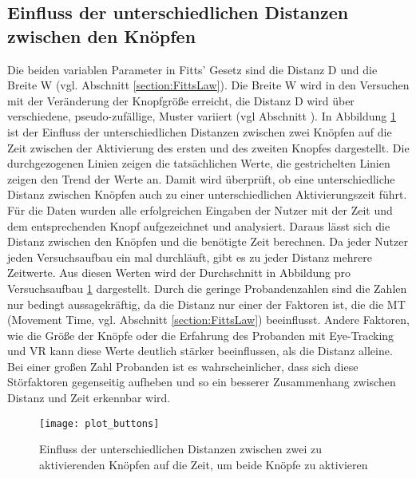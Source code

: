 \subsection{Einfluss der unterschiedlichen Distanzen zwischen den Knöpfen}
Die beiden variablen Parameter  in Fitts' Gesetz sind die Distanz D und die Breite W (vgl. Abschnitt \ref{section:FittsLaw}). Die Breite W wird in den Versuchen mit der Veränderung der Knopfgröße erreicht, die Distanz D wird über verschiedene, pseudo-zufällige, Muster variiert (vgl Abschnitt ). In Abbildung \ref{fig:plotbuttons} ist der Einfluss der unterschiedlichen Distanzen zwischen zwei Knöpfen auf die Zeit zwischen der Aktivierung des ersten und des zweiten Knopfes dargestellt. Die durchgezogenen Linien zeigen die tatsächlichen Werte, die gestrichelten Linien zeigen den Trend der Werte an. Damit wird überprüft, ob eine unterschiedliche Distanz zwischen Knöpfen auch zu einer unterschiedlichen Aktivierungszeit führt. Für die Daten wurden alle erfolgreichen Eingaben der Nutzer mit der Zeit und dem entsprechenden Knopf aufgezeichnet und analysiert. Daraus lässt sich die Distanz zwischen den Knöpfen und die benötigte Zeit berechnen. Da jeder Nutzer jeden Versuchsaufbau ein mal durchläuft, gibt es zu jeder Distanz mehrere Zeitwerte. Aus diesen Werten wird der Durchschnitt in Abbildung pro Versuchsaufbau \ref{fig:plotbuttons} dargestellt. Durch die geringe Probandenzahlen sind die Zahlen nur bedingt aussagekräftig, da die Distanz nur einer der Faktoren ist, die die MT (Movement Time, vgl. Abschnitt \ref{section:FittsLaw}) beeinflusst. Andere Faktoren, wie die Größe der Knöpfe oder die Erfahrung des Probanden mit Eye-Tracking und VR kann diese Werte deutlich stärker beeinflussen, als die Distanz alleine. Bei einer großen Zahl Probanden ist es wahrscheinlicher, dass sich diese Störfaktoren gegenseitig aufheben und so ein besserer Zusammenhang zwischen Distanz und Zeit erkennbar wird.
\begin{figure}[!htbp]
	\centering
	\texttt{[image: plot\_buttons]}
	\caption[Einfluss der unterschiedlichen Distanzen zwischen zwei zu aktivierenden Knöpfen auf die Zeit, um beide Knöpfe zu aktivieren]{Einfluss der unterschiedlichen Distanzen zwischen zwei zu aktivierenden Knöpfen auf die Zeit, um beide Knöpfe zu aktivieren}
	\label{fig:plotbuttons}
\end{figure}
